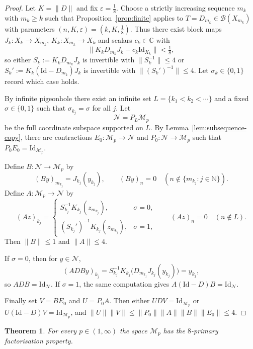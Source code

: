 \documentclass[11pt]{amsart}
\theoremstyle{plain}
\newtheorem{theorem}{Theorem}[section]
\theoremstyle{definition}
\numberwithin{equation}{section}
\newcommand{\norm}[1]{\lVert #1 \rVert}
\newcommand{\Bop}{\mathcal{B}}
\newcommand{\N}{\mathbb{N}}
\newcommand{\C}{\mathbb{C}}
\newcommand{\Id}{\mathrm{Id}}
\renewcommand{\le}{\leqslant}
\renewcommand{\ge}{\geqslant}
\begin{document}
\begin{proof}
Let $K=\norm{D}$ and fix $\varepsilon=\tfrac18$.
Choose a strictly increasing sequence $m_k$ with $m_k\ge k$ such that Proposition~\ref{prop:finite} applies to $T=D_{m_k}\in\Bop(X_{m_k})$
with parameters $(n,K,\varepsilon)=(k,K,\tfrac18)$.
Thus there exist block maps $J_k\colon X_k\to X_{m_k}$, $K_k\colon X_{m_k}\to X_k$ and scalars $c_k\in\C$ with
\[
\norm{K_k D_{m_k} J_k - c_k \Id_{X_k}}<\tfrac18,
\]
so either $S_k:=K_kD_{m_k}J_k$ is invertible with $\norm{S_k^{-1}}\le 4$ or
$S_k':=K_k(\Id-D_{m_k})J_k$ is invertible with $\norm{(S_k')^{-1}}\le 4$.
Let $\sigma_k\in\{0,1\}$ record which case holds.

By infinite pigeonhole there exist an infinite set $L=\{k_1<k_2<\cdots\}$ and a fixed $\sigma\in\{0,1\}$ such that $\sigma_{k_j}=\sigma$ for all $j$.
Let
\[
    \mathcal N=P_L\mathcal M_p
\]
be the full coordinate subspace supported on $L$. By Lemma~\ref{lem:subsequence-copy}, there are contractions
$E_0\colon\mathcal M_p\to\mathcal N$ and $P_0\colon\mathcal N\to\mathcal M_p$ such that $P_0E_0=\Id_{\mathcal M_p}$.

Define $B\colon\mathcal N\to\mathcal M_p$ by
\[
    (By)_{m_{k_j}}=J_{k_j}(y_{k_j}),
    \qquad
    (By)_n=0\quad(n\notin\{m_{k_j}:j\in\N\}).
\]
Define $A\colon\mathcal M_p\to\mathcal N$ by
\[
(Az)_{k_j}=
\begin{cases}
S_{k_j}^{-1}K_{k_j}(z_{m_{k_j}}),&\sigma=0,\\
(S_{k_j}')^{-1}K_{k_j}(z_{m_{k_j}}),&\sigma=1,
\end{cases}
\qquad
(Az)_n=0\quad(n\notin L).
\]
Then $\|B\|\le1$ and $\|A\|\le4$.

If $\sigma=0$, then for $y\in\mathcal N$,
\[
    (ADB y)_{k_j}=S_{k_j}^{-1}K_{k_j}\bigl(D_{m_{k_j}}J_{k_j}(y_{k_j})\bigr)
    =y_{k_j},
\]
so $ADB=\Id_{\mathcal N}$. If $\sigma=1$, the same computation gives
$A(\Id-D)B=\Id_{\mathcal N}$.

Finally set $V=BE_0$ and $U=P_0A$. Then either $UDV=\Id_{\mathcal M_p}$ or
$U(\Id-D)V=\Id_{\mathcal M_p}$, and
\(
    \|U\|\|V\|\le \|P_0\|\|A\|\|B\|\|E_0\|\le4.
\)
\end{proof}


\begin{theorem}\label{thm:MpUPFP}
    For every $p\in(1,\infty)$ the space $\mathcal{M}_p$ has the $8$-primary factorisation property.
\end{theorem}
\end{document}
